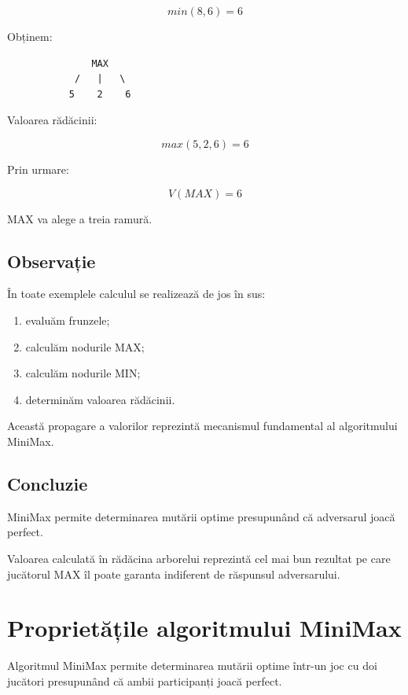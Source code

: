\documentclass[12pt,a4paper]{article}
\begin{document}
\[
min(8,6)=6
\]

Obținem:

\begin{verbatim}
               MAX
            /   |   \
           5    2    6
\end{verbatim}

Valoarea rădăcinii:

\[
max(5,2,6)=6
\]

Prin urmare:

\[
V(MAX)=6
\]

MAX va alege a treia ramură.

\subsection{Observație}

În toate exemplele calculul se realizează de jos în sus:

\begin{enumerate}
\item evaluăm frunzele;
\item calculăm nodurile MAX;
\item calculăm nodurile MIN;
\item determinăm valoarea rădăcinii.
\end{enumerate}

Această propagare a valorilor reprezintă mecanismul fundamental al algoritmului MiniMax.

\subsection{Concluzie}

MiniMax permite determinarea mutării optime presupunând că adversarul joacă perfect.

Valoarea calculată în rădăcina arborelui reprezintă cel mai bun rezultat pe care jucătorul MAX îl poate garanta indiferent de răspunsul adversarului.










\section{Proprietățile algoritmului MiniMax}

Algoritmul MiniMax permite determinarea mutării optime într-un joc cu doi jucători presupunând că ambii participanți joacă perfect.
\end{document}
